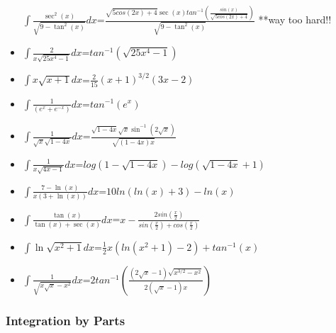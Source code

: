 \begin{itemize}
  \(\displaystyle\int \frac{\sec^2(x)}{\sqrt{9-\tan^2(x)}}dx\)=\(\frac{\sqrt{5cos(2x)+4}\sec(x)tan^{-1}(\frac{sin(x)}{\sqrt{5cos(2x)+4}})}{\sqrt{9-\tan^2(x)}}\)
  **way too hard!!
\item
  \(\displaystyle\int \frac{2}{x\sqrt{25x^4-1}}dx\)=\(tan^{-1}(\sqrt{25x^4-1})\)
\item
  \(\displaystyle\int x\sqrt{x+1}dx\)=\(\frac{2}{15}(x+1)^{3/2}(3x-2)\)
\item
  \(\displaystyle\int \frac{1}{(e^x + e^{-x})}dx\)=\(tan^{-1}(e^x)\)
\item
  \(\displaystyle\int \frac{1}{\sqrt{x}\sqrt{1-4x}}dx\)=\(\frac{\sqrt{1-4x}\sqrt{x}\sin^{-1}(2\sqrt{x})}{\sqrt{(1-4x)x}}\)
\item
  \(\displaystyle\int \frac{1}{x\sqrt{4x-1}}dx\)=\(log(1-\sqrt{1-4x})-log(\sqrt{1-4x}+1)\)
\item
  \(\displaystyle\int \frac{7-\ln(x)}{x(3+\ln(x))}dx\)=\(10ln(ln(x)+3)-ln(x)\)
\item
  \(\displaystyle\int \frac{\tan(x)}{\tan(x) + \sec(x)}dx\)=\(x-\frac{2sin(\frac{x}{2})}{sin(\frac{x}{2})+cos(\frac{x}{2})}\)
\item
  \(\displaystyle\int \ln\sqrt{x^2+1}dx\)=\(\frac{1}{2}x(ln(x^2+1)-2)+tan^{-1}(x)\)
\item
  \(\displaystyle\int \frac{1}{\sqrt{x\sqrt{x}-x^2}}dx\)=\(2tan^{-1}(\frac{(2\sqrt{x}-1)\sqrt{x^{3/2}-x^2}}{2(\sqrt{x}-1)x})\)
\end{itemize}

\hypertarget{integration-by-parts}{%
\subsubsection{Integration by Parts}\label{integration-by-parts}}

